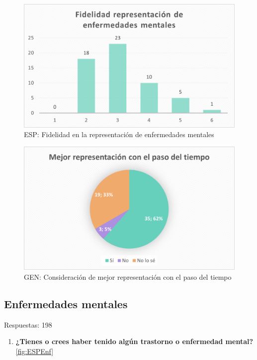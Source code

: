 \documentclass[12pt, a4paper,twoside,titlepage]{book}
\begin{document}
\begin{figure}
    \centering
    \includegraphics[width=.8\linewidth]{ANEXO ESP/18AnexESPDife}
    \caption{ESP: Fidelidad en la representación de enfermedades mentales}
    \label{fig:ESPFidel}
\end{figure}

\begin{figure}
    \centering
    \includegraphics[width=.8\linewidth]{ANEXO ESP/19AnexESPMejor}
    \caption{GEN: Consideración de mejor representación con el paso del tiempo}
    \label{fig:ESPMejor}
\end{figure}





\subsection{Enfermedades mentales}
Respuestas: 198
\begin{enumerate}[label=\textbf{\arabic*}.]
     \item \textbf{¿Tienes o crees haber tenido algún trastorno o enfermedad mental? }\\
     \ref{fig:ESPEnf}
\end{enumerate}
\end{document}
